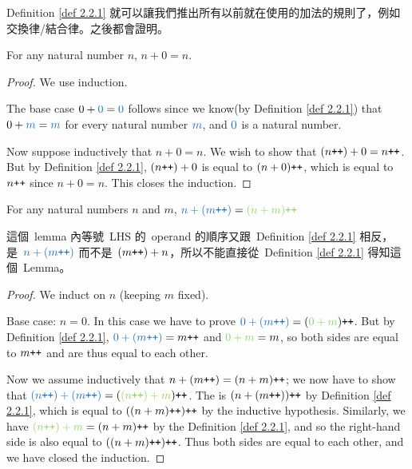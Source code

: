 \begin{note}
Definition \ref{def 2.2.1} 就可以讓我們推出所有以前就在使用的加法的規則了，例如交換律/結合律。之後都會證明。
\end{note}

\begin{lemma}\label{lem 2.2.2}
For any natural number \(n\), \(n + 0 = n\).
\end{lemma}
\begin{proof} We use induction.

The base case \(0 + \BLUE{0} = \BLUE{0}\) follows since we know(by Definition \ref{def 2.2.1}) that \(0 + \BLUE{m} = \BLUE{m}\) for every natural number \(\BLUE{m}\), and \(\BLUE{0}\) is a natural number.

Now suppose inductively that \(n + 0 = n\). We wish to show that \((n\texttt{++})+0 = n\texttt{++}\). But by Definition \ref{def 2.2.1}, \((n\texttt{++}) + 0\) is equal to \((n + 0)\texttt{++}\), which is equal to \(n\texttt{++}\) since \(n + 0 = n\). This closes the induction.
\end{proof}

\begin{lemma}\label{lem 2.2.3} For any natural numbers \(n\) and \(m\), \(\BLUE{n + (m\INC)} = \GREEN{(n + m)\INC}\)
\end{lemma}
\begin{note}
這個\ lemma 內等號\ LHS 的\ operand 的順序又跟\ Definition \ref{def 2.2.1} 相反，是\ \(\BLUE{n + (m\INC)}\) 而不是\  \((m\texttt{++}) + n\)，所以不能直接從\ Definition \ref{def 2.2.1} 得知這個\ Lemma。
\end{note}
\begin{proof}
We induct on \(n\) (keeping \(m\) fixed).

Base case: \(n = 0\). In this case we have to prove \( \BLUE{0 + (m\INC)} = (\GREEN{0 + m})\INC\). But by Definition \ref{def 2.2.1}, \(\BLUE{0 + (m\INC)} = m\INC\) and \(\GREEN{0 + m} = m\), so both sides are equal to \(m\texttt{++}\) and are thus equal to each other.

Now we assume inductively that \(n + (m\texttt{++}) = (n + m)\texttt{++}\); we now have to show that \(\BLUE{(n\INC) + (m\INC)} = (\GREEN{(n\INC) + m})\INC\). The  is \((n + (m\texttt{++}))\texttt{++}\) by Definition \ref{def 2.2.1}, which is equal to \(((n + m)\texttt{++})\texttt{++}\) by the inductive hypothesis. Similarly, we have \(\GREEN{(n\INC) + m} =(n + m)\INC\) by the Definition \ref{def 2.2.1}, and so the right-hand side is also equal to \(((n + m)\texttt{++})\texttt{++}\). Thus both sides are equal to each other, and we have closed the induction.
\end{proof}

